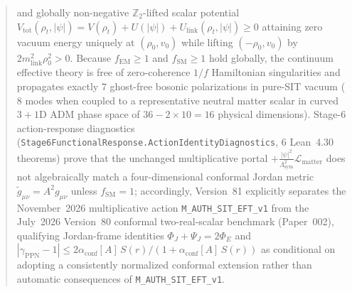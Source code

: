 \begin{abstract}
and globally non-negative $\mathbb{Z}_2$-lifted scalar potential $V_{\mathrm{tot}}(\rho_t,|\psi|) = V(\rho_t) + U(|\psi|) + U_{\mathrm{link}}(\rho_t,|\psi|) \ge 0$ attaining zero vacuum energy uniquely at $(\rho_0, v_0)$ while lifting $(-\rho_0, v_0)$ by $2 m_{\mathrm{link}}^2 \rho_0^2 > 0$. Because $f_{\mathrm{EM}} \ge 1$ and $f_{\mathrm{SM}} \ge 1$ hold globally, the continuum effective theory is free of zero-coherence $1/f$ Hamiltonian singularities and propagates exactly $7$ ghost-free bosonic polarizations in pure-SIT vacuum ($8$ modes when coupled to a representative neutral matter scalar in curved $3+1$D ADM phase space of $36 - 2\times 10 = 16$ physical dimensions). Stage-6 action-response diagnostics (\texttt{Stage6FunctionalResponse.\allowbreak{}ActionIdentityDiagnostics}, $6$ Lean~4.30 theorems) prove that the unchanged multiplicative portal $+\frac{|\psi|^2}{\Lambda_{\mathrm{sym}}^2}\mathcal{L}_{\mathrm{matter}}$ does not algebraically match a four-dimensional conformal Jordan metric $\tilde{g}_{\mu\nu} = A^2 g_{\mu\nu}$ unless $f_{\mathrm{SM}} = 1$; accordingly, Version~81 explicitly separates the November~2026 multiplicative action \texttt{M\_AUTH\_SIT\_EFT\_v1} from the July~2026 Version~80 conformal two-real-scalar benchmark (Paper~002), qualifying Jordan-frame identities $\Phi_J + \Psi_J = 2\Phi_E$ and $|\gamma_{\mathrm{PPN}} - 1| \le 2\alpha_{\mathrm{conf}}[A]\,S(r)/(1 + \alpha_{\mathrm{conf}}[A]\,S(r))$ as conditional on adopting a consistently normalized conformal extension rather than automatic consequences of \texttt{M\_AUTH\_SIT\_EFT\_v1}.


\end{abstract}
